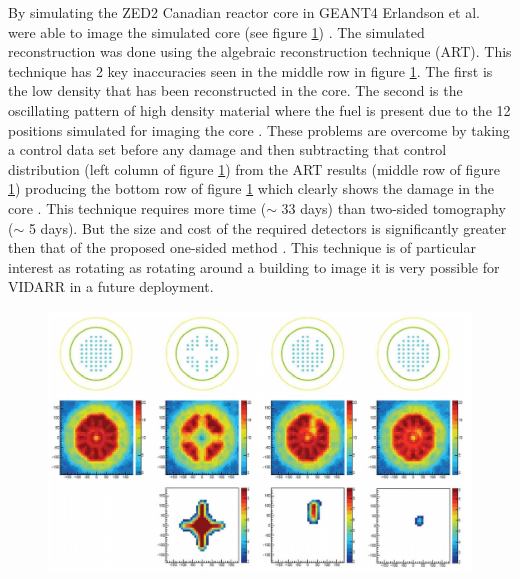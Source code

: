 By simulating the ZED2 Canadian reactor core in GEANT4 Erlandson et al. were able to image the simulated core (see figure \ref{fig:Zed2OstSimulation}) \cite{Erlandson_reactorOST_2018} . The simulated reconstruction was done using the algebraic reconstruction technique (ART). This technique has 2 key inaccuracies seen in the middle row in figure \ref{fig:Zed2OstSimulation}. The first is the low density that has been reconstructed in the core. The second is the oscillating pattern of high density material where the fuel is present due to the 12 positions simulated for imaging the core\cite{Erlandson_reactorOST_2018} . These problems are overcome by taking a control data set before any damage and then subtracting that control distribution (left column of figure \ref{fig:Zed2OstSimulation}) from the ART results (middle row of figure \ref{fig:Zed2OstSimulation}) producing the bottom row of figure \ref{fig:Zed2OstSimulation} which clearly shows the damage in the core \cite{Erlandson_reactorOST_2018}. This technique requires more time ($\sim$ 33 days) than two-sided tomography ($\sim$ 5 days). But the size and cost of the required detectors is significantly greater then that of the proposed one-sided method \cite{Erlandson_reactorOST_2018}. This technique is of particular interest as rotating as rotating around a building to image it is very possible for VIDARR in a future deployment.

\begin{figure}[!h]
 \centering
 \includegraphics[width=1.0\linewidth]{Chapter5/Figs/MuTomographyExamples/Zed2OstSimulation.jpg}
 \label{fig:Zed2OstSimulation}
\end{figure}

